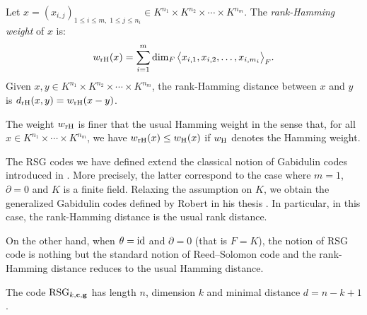 \documentclass[a4paper]{llncs}
\newcommand{\id}{\textrm{\rm id}}
\newcommand{\bc}{\textbf{c}}
\newcommand{\bg}{\textbf{g}}
\newcommand{\RSG}{\textrm{\rm RSG}}
\newcommand{\wH}{w_{\textrm{\rm H}}}
\newcommand{\wrH}{w_{\textrm{\rm rH}}}
\newcommand{\drH}{d_{\textrm{\rm rH}}}
\begin{document}
\begin{definition}
Let $x = (x_{i,j})_{1 \leq i \leq m, \; 1 \leq j \leq n_i} \in
K^{n_1} \times K^{n_2} \times \cdots \times K^{n_m}$.
The \emph{rank-Hamming weight} of $x$ is:
$$\wrH(x) = 
\sum_{i=1}^m \dim_F \big< x_{i,1}, x_{i,2}, \ldots, x_{i,{m_i}} \big>_F.$$
Given $x, y \in K^{n_1} \times K^{n_2} \times \cdots \times K^{n_m}$, 
the {rank-Hamming distance} between $x$ and $y$ is $\drH(x,y) = 
\wrH(x-y)$.
\end{definition}

\begin{remark}
The weight $\wrH$ is finer that the usual Hamming weight in the 
sense that, for all $x \in K^{n_1} \times \cdots \times K^{n_m}$, 
we have $\wrH(x) \leq \wH(x)$ if $\wH$ denotes the Hamming weight.
\end{remark}

The RSG codes we have defined extend the classical notion of Gabidulin 
codes introduced in \cite{gabidulin}. More precisely, the latter correspond to 
the case where $m = 1$, $\partial = 0$ and $K$ is a finite field. 
Relaxing the assumption on $K$, we obtain the generalized Gabidulin 
codes defined by Robert in his thesis \cite{robert}. In particular, in this 
case, the rank-Hamming distance is the usual rank distance.

On the other hand, when $\theta = \id$ and $\partial = 0$ (that is $F = 
K$), the notion of RSG code is nothing but the standard notion of 
Reed--Solomon code and the rank-Hamming distance reduces to the 
usual Hamming distance.

\begin{proposition}
The code $\RSG_{k,\bc,\bg}$ has length $n$,
dimension $k$ and minimal distance $d = n - k + 1$.
\end{proposition}
\end{document}
